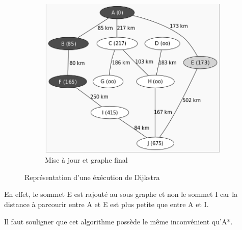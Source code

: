 \begin{figure}[h!]
        \begin{subfigure}[h!]{0.4\textwidth}
                \includegraphics[width=\textwidth]{pics/dijk3.png}
                \caption{Mise à jour et graphe final}
        \end{subfigure}
        \caption{\label{fig:dijkstra}Représentation d'une éxécution de Dijkstra \cite{wikiDijkstra}}
\end{figure}


En effet, le sommet E est rajouté au sous graphe et non le sommet I car la distance à parcourir entre A et E est plus petite que entre A et I.

Il faut souligner que cet algorithme possède le même inconvénient qu'A*.


